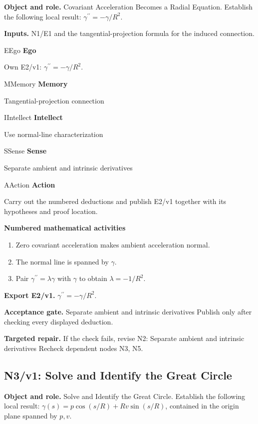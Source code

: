 \documentclass[preprint,12pt,aps,pra,showkeys,amsmath,amssymb,superscriptaddress,floatfix]{revtex4-2}
\theoremstyle{definition}
\theoremstyle{remark}
\newcommand{\mmfaculty}[3]{%
 \begin{mmfacultybox}{#1}{#2}
 {\sffamily\bfseries\color{MMBlue}#2}\par\smallskip #3
 \end{mmfacultybox}}
\newcommand{\field}[2]{\par\smallskip\noindent\textbf{#1.} #2\par}
\begin{document}
\field{Object and role}{Covariant Acceleration Becomes a Radial Equation. Establish the
following local result: \(\gamma^{\prime\prime}=-\gamma/R^2\).}

\field{Inputs}{N1/E1 and the tangential-projection formula for the induced connection.}

\mmfaculty{E}{Ego}{Own E2/v1: \(\gamma^{\prime\prime}=-\gamma/R^2\).}

\mmfaculty{M}{Memory}{Tangential-projection connection}

\mmfaculty{I}{Intellect}{Use normal-line characterization}

\mmfaculty{S}{Sense}{Separate ambient and intrinsic derivatives}

\mmfaculty{A}{Action}{Carry out the numbered deductions and publish E2/v1 together with its
hypotheses and proof location.}

\smallskip\noindent\textbf{Numbered mathematical activities}

\begin{enumerate}[label=N2.\arabic*,leftmargin=3.4em]

\item Zero covariant acceleration makes ambient acceleration normal.

\item The normal line is spanned by \(\gamma\).

\item Pair \(\gamma^{\prime\prime}=\lambda\gamma\) with \(\gamma\) to obtain
\(\lambda=-1/R^2\).

\end{enumerate}

\field{Export E2/v1}{\(\gamma^{\prime\prime}=-\gamma/R^2\).}

\field{Acceptance gate}{Separate ambient and intrinsic derivatives Publish only after checking
every displayed deduction.}

\field{Targeted repair}{If the check fails, revise N2: Separate ambient and intrinsic
derivatives Recheck dependent nodes N3, N5.}

\clearpage

\subsection{N3/v1: Solve and Identify the Great Circle}

\field{Object and role}{Solve and Identify the Great Circle. Establish the following local
result: \(\gamma(s)=p\cos(s/R)+Rv\sin(s/R)\), contained in the origin
plane spanned by \(p,v\).}
\end{document}
